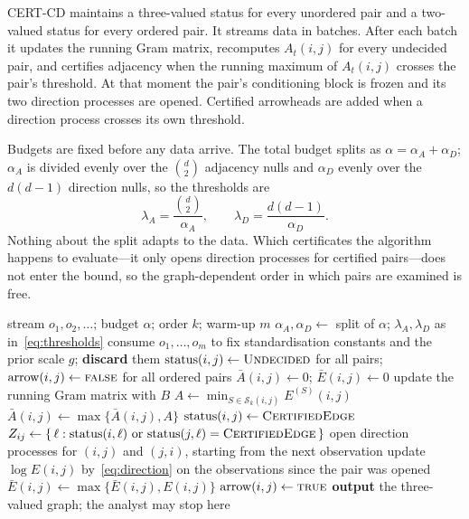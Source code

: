 \documentclass[pdflatex,sn-apa]{sn-jnl}
\theoremstyle{thmstyleone}%
\theoremstyle{thmstyletwo}%
\theoremstyle{thmstylethree}%
\newcommand{\Scal}{\mathcal{S}}
\begin{document}
CERT-CD maintains a three-valued status for every unordered pair and a
two-valued status for every ordered pair. It streams data in batches. After
each batch it updates the running Gram matrix, recomputes $A_t(i,j)$ for every
undecided pair, and certifies adjacency when the running maximum of $A_t(i,j)$
crosses the pair's threshold. At that moment the pair's conditioning block is
frozen and its two direction processes are opened. Certified arrowheads are
added when a direction process crosses its own threshold.

Budgets are fixed before any data arrive. The total budget splits as
$\alpha = \alpha_A + \alpha_D$; $\alpha_A$ is divided evenly over the
$\binom{d}{2}$ adjacency nulls and $\alpha_D$ evenly over the $d(d-1)$
direction nulls, so the thresholds are
\begin{equation}\label{eq:thresholds}
\lambda_A = \frac{\binom{d}{2}}{\alpha_A},
\qquad
\lambda_D = \frac{d(d-1)}{\alpha_D}.
\end{equation}
Nothing about the split adapts to the data. Which certificates the algorithm
happens to evaluate---it only opens direction processes for certified
pairs---does not enter the bound, so the graph-dependent order in which pairs
are examined is free.

\begin{algorithm}[t]
\caption{CERT-CD}\label{alg:certcd}
\begin{algorithmic}[1]
\Require stream $o_1, o_2, \dots$; budget $\alpha$; order $k$; warm-up $m$
\State $\alpha_A, \alpha_D \gets$ split of $\alpha$;
       $\lambda_A, \lambda_D$ as in~\eqref{eq:thresholds}
\State consume $o_1,\dots,o_m$ to fix standardisation constants and the prior
       scale $g$; \textbf{discard} them
\State $\mathrm{status}(i,j) \gets \textsc{Undecided}$ for all pairs;
       $\mathrm{arrow}(i,j) \gets \textsc{false}$ for all ordered pairs
\State $\bar A(i,j) \gets 0$; $\bar E(i,j) \gets 0$
  \State update the running Gram matrix with $B$
    \State $A \gets \min_{S \in \Scal_k(i,j)} E^{(S)}(i,j)$
    \State $\bar A(i,j) \gets \max\{\bar A(i,j), A\}$
      \State $\mathrm{status}(i,j) \gets \textsc{CertifiedEdge}$
      \State $Z_{ij} \gets \{\,\ell : \mathrm{status}(i,\ell) \text{ or }
             \mathrm{status}(j,\ell) = \textsc{CertifiedEdge} \,\}$
      \State open direction processes for $(i,j)$ and $(j,i)$, starting from
             the next observation
    \EndIf
  \EndFor
    \State update $\log E(i,j)$ by~\eqref{eq:direction} on the observations
           since the pair was opened
    \State $\bar E(i,j) \gets \max\{\bar E(i,j), E(i,j)\}$
     $\mathrm{arrow}(i,j) \gets \textsc{true}$
    \EndIf
  \EndFor
  \State \textbf{output} the three-valued graph; the analyst may stop here
\EndFor
\end{algorithmic}
\end{algorithm}
\end{document}
